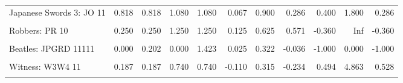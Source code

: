 \documentclass[
  10pt,
]{scrartcl}
\begin{document}
\begin{table}[H]
{\begin{tabular}[t]{lrrrrrrrrrr}
Japanese Swords 3: JO 11 & 0.818 & 0.818 & 1.080 & 1.080 & 0.067 & 0.900 & 0.286 & 0.400 & 1.800 & 0.286\\
\cellcolor{gray!6}{Robbers: PR 11} & \cellcolor{gray!6}{0.600} & \cellcolor{gray!6}{0.600} & \cellcolor{gray!6}{0.937} & \cellcolor{gray!6}{0.937} & \cellcolor{gray!6}{-0.050} & \cellcolor{gray!6}{0.750} & \cellcolor{gray!6}{-0.143} & \cellcolor{gray!6}{0.600} & \cellcolor{gray!6}{Inf} & \cellcolor{gray!6}{0.600}\\
Robbers: PR 10 & 0.250 & 0.250 & 1.250 & 1.250 & 0.125 & 0.625 & 0.571 & -0.360 & Inf & -0.360\\
\cellcolor{gray!6}{Robbers: PR 01} & \cellcolor{gray!6}{0.250} & \cellcolor{gray!6}{0.250} & \cellcolor{gray!6}{1.250} & \cellcolor{gray!6}{1.250} & \cellcolor{gray!6}{0.125} & \cellcolor{gray!6}{0.625} & \cellcolor{gray!6}{0.571} & \cellcolor{gray!6}{-0.360} & \cellcolor{gray!6}{Inf} & \cellcolor{gray!6}{-0.360}\\
Beatles: JPGRD 11111 & 0.000 & 0.202 & 0.000 & 1.423 & 0.025 & 0.322 & -0.036 & -1.000 & 0.000 & -1.000\\
\cellcolor{gray!6}{Witness: W1W2 11} & \cellcolor{gray!6}{0.451} & \cellcolor{gray!6}{0.451} & \cellcolor{gray!6}{3.551} & \cellcolor{gray!6}{3.551} & \cellcolor{gray!6}{0.446} & \cellcolor{gray!6}{0.621} & \cellcolor{gray!6}{0.771} & \cellcolor{gray!6}{0.729} & \cellcolor{gray!6}{18.501} & \cellcolor{gray!6}{0.871}\\
Witness: W3W4 11 & 0.187 & 0.187 & 0.740 & 0.740 & -0.110 & 0.315 & -0.234 & 0.494 & 4.863 & 0.528\\
\cellcolor{gray!6}{Witness: W4W5 11} & \cellcolor{gray!6}{0.365} & \cellcolor{gray!6}{0.365} & \cellcolor{gray!6}{1.260} & \cellcolor{gray!6}{1.260} & \cellcolor{gray!6}{0.110} & \cellcolor{gray!6}{0.535} & \cellcolor{gray!6}{0.218} & \cellcolor{gray!6}{0.602} & \cellcolor{gray!6}{5.236} & \cellcolor{gray!6}{0.637}\\
\bottomrule
\end{tabular}}
\end{table}
\end{document}
